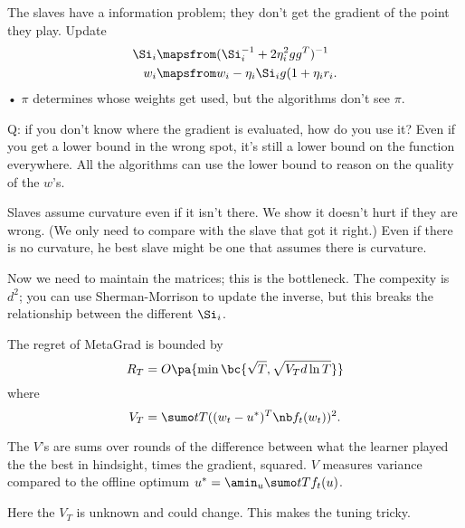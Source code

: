 The slaves have a information problem; they don't get the gradient of the point they play. 
Update
\begin{align}
\Si_i &\mapsfrom (\Si_i^{-1} + 2\eta_i^2gg^T)^{-1}\\
w_i &\mapsfrom w_i-\eta_i \Si_i g(1+\eta_ir_i.
\end{align}•
$\pi$ determines whose weights get used, but the algorithms don't see $\pi$.


Q: if you don't know where the gradient is evaluated, how do you use it?
Even if you get a lower bound in the wrong spot, it's still a lower bound on the function everywhere. All the algorithms can use the lower bound to reason on the quality of the $w$'s.


Slaves assume curvature even if it isn't there. We show it doesn't hurt if they are wrong. (We only need to compare with the slave that got it right.) Even if there is no curvature, he best slave might be one that assumes there is curvature.



Now we need to maintain the matrices; this is the bottleneck. The compexity is $d^2$; you can use Sherman-Morrison to update the inverse, but this breaks the relationship between the different $\Si_i$.

\begin{thm}
The regret of MetaGrad is bounded by 
$$
R_T = O\pa{
\min\bc{\sqrt T, \sqrt{V_T d\ln T}}
}
$$
where 
$$
V_T =\sumo tT ((w_t-u^*)^T \nb f_t(w_t))^2.
$$
\end{thm}
The $V$'s are sums over rounds of the difference between what the learner played the the best in hindsight, times the gradient, squared. $V$ measures variance compared to the offline optimum $u^*=\amin_u \sumo tT f_t(u)$.

Here the $V_T$ is unknown and could change. This makes the tuning tricky.

